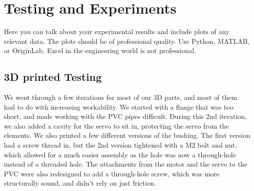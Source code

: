 \section{Testing and Experiments}
Here you can talk about your experimental results and include plots of any relevant data. The plots should be of professional quality. Use Python, MATLAB, or OriginLab. Excel in the engineering world is not professional. 


\subsection{3D printed Testing}

We went through a few iterations for most of our 3D parts, and most of them had to do with increasing workability. We started with a flange that was too short, and made working with the PVC pipes difficult. During this 2nd iteration, we also added a cavity for the servo to sit in, protecting the servo from the elements. We also printed a few different versions of the bushing. The first version had a screw thread in, but the 2nd version tightened with a M2 bolt and nut, which allowed for a much easier assembly as the hole was now a through-hole instead of a threaded hole. The attachments from the motor and the servo to the PVC were also redesigned to add a through-hole screw, which was more structurally sound, and didn't rely on just friction. 